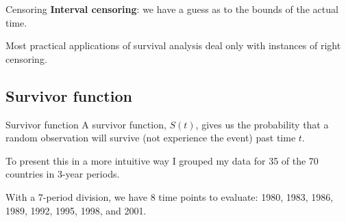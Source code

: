 \documentclass[12pt,english,pdf,xcolor=dvipsnames,aspectratio=169]{beamer}\usepackage[]{graphicx}\usepackage[]{xcolor}
\begin{document}
\begin{frame}{Censoring}
\textbf{Interval censoring}: we have a guess as to the bounds of the actual time.\bigskip

\begin{figure}
\centering
{}
\end{figure}

Most practical applications of survival analysis deal only with instances of right censoring.
\end{frame}



\subsection{Survivor function}
\begin{frame}{Survivor function}
A survivor function, $S(t)$, gives us the probability that a random observation will survive (not experience the event) past time $t$.\bigskip

To present this in a more intuitive way I grouped my data for 35 of the 70 countries in 3-year periods.\bigskip

With a 7-period division, we have 8 time points to evaluate: 1980, 1983, 1986, 1989, 1992, 1995, 1998, and 2001.


\end{frame}
\end{document}
